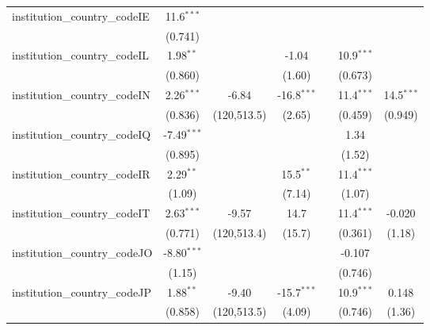 \begin{tabular}{lcccccc}
   institution\_country\_codeIE          & 11.6$^{***}$   &               &               &            &               &   \\   
                                         & (0.741)        &               &               &            &               &   \\   
   institution\_country\_codeIL          & 1.98$^{**}$    &               & -1.04         &            & 10.9$^{***}$  &   \\   
                                         & (0.860)        &               & (1.60)        &            & (0.673)       &   \\   
   institution\_country\_codeIN          & 2.26$^{***}$   & -6.84         & -16.8$^{***}$ &            & 11.4$^{***}$  & 14.5$^{***}$\\   
                                         & (0.836)        & (120,513.5)   & (2.65)        &            & (0.459)       & (0.949)\\   
   institution\_country\_codeIQ          & -7.49$^{***}$  &               &               &            & 1.34          &   \\   
                                         & (0.895)        &               &               &            & (1.52)        &   \\   
   institution\_country\_codeIR          & 2.29$^{**}$    &               & 15.5$^{**}$   &            & 11.4$^{***}$  &   \\   
                                         & (1.09)         &               & (7.14)        &            & (1.07)        &   \\   
   institution\_country\_codeIT          & 2.63$^{***}$   & -9.57         & 14.7          &            & 11.4$^{***}$  & -0.020\\   
                                         & (0.771)        & (120,513.4)   & (15.7)        &            & (0.361)       & (1.18)\\   
   institution\_country\_codeJO          & -8.80$^{***}$  &               &               &            & -0.107        &   \\   
                                         & (1.15)         &               &               &            & (0.746)       &   \\   
   institution\_country\_codeJP          & 1.88$^{**}$    & -9.40         & -15.7$^{***}$ &            & 10.9$^{***}$  & 0.148\\   
                                         & (0.858)        & (120,513.5)   & (4.09)        &            & (0.746)       & (1.36)\\   

\end{tabular}
